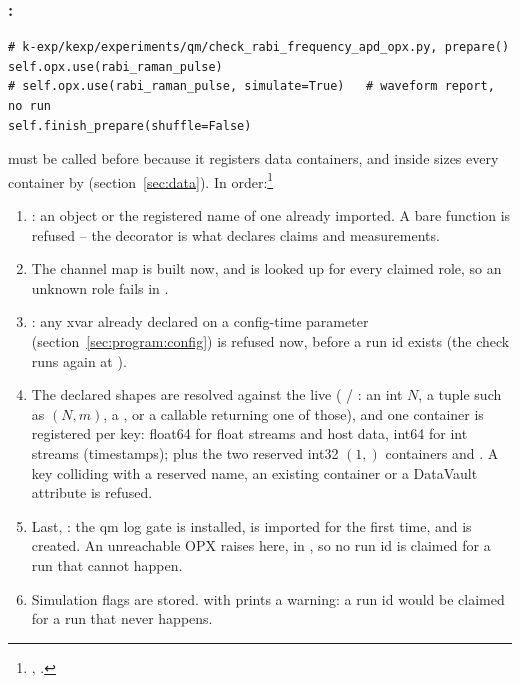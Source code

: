 \subsubsection{: }

\begin{lstlisting}[style=py]
# k-exp/kexp/experiments/qm/check_rabi_frequency_apd_opx.py, prepare()
self.opx.use(rabi_raman_pulse)
# self.opx.use(rabi_raman_pulse, simulate=True)   # waveform report, no run
self.finish_prepare(shuffle=False)
\end{lstlisting}

 must be called before  because it
registers data containers, and  inside
 sizes every container by 
(section~\ref{sec:data}). In order:\footnote{,
.}

\begin{enumerate}[nosep]
  \item {}: an  object or the
    registered name of one already imported. A bare function is refused --
    the decorator is what declares claims and measurements.
  \item The channel map is built now, and  is looked up
    for every claimed role, so an unknown role fails in .
  \item {}: any xvar already declared on a
    config-time parameter (section~\ref{sec:program:config}) is refused now,
    before a run id exists (the check runs again at ).
  \item The declared shapes are resolved against the live 
    ( / : an
    int $N$, a tuple such as $(N, m)$, a , or a
    callable  returning one of those), and one
     container is registered per key: float64 for float
    streams and host data, int64 for int streams (timestamps); plus the two
    reserved int32 $(1,)$ containers  and
    . A key colliding with a reserved name, an
    existing container or a DataVault attribute is refused.
  \item Last, : the qm log gate is installed,  is
    imported for the first time, and  is created. An unreachable OPX raises 
    here, in , so no run id is claimed for a run that cannot
    happen.
  \item Simulation flags are stored.  with
     prints a warning: a run id would be claimed for a
    run that never happens.
\end{enumerate}

